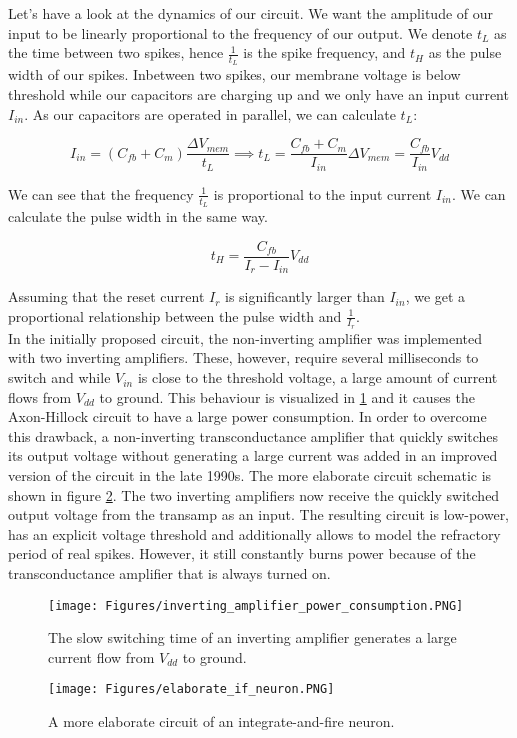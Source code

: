 Let's have a look at the dynamics of our circuit. We want the amplitude of our input to be linearly proportional to the frequency of our output. We denote $t_L$ as the time between two spikes, hence $\frac{1}{t_L}$ is the spike frequency, and $t_H$ as the pulse width of our spikes. Inbetween two spikes, our membrane voltage is below threshold while our capacitors are charging up and we only have an input current $I_{in}$. As our capacitors are operated in parallel, we can calculate $t_L$:

\begin{equation}
    I_{in} = (C_{fb} + C_m) \frac{\Delta V_{mem}}{t_L} \implies t_L = \frac{C_{fb} + C_m}{I_{in}} \Delta V_{mem} = \frac{C_{fb}}{I_{in}} V_{dd}
\end{equation}

We can see that the frequency $\frac{1}{t_L}$ is proportional to the input current $I_{in}$. We can calculate the pulse width in the same way.

\begin{equation}
    t_H = \frac{C_{fb}}{I_r - I_{in}} V_{dd}
\end{equation}

Assuming that the reset current $I_r$ is significantly larger than $I_{in}$, we get a proportional relationship between the pulse width and $\frac{1}{I_r}$.\\

In the initially proposed circuit, the non-inverting amplifier was implemented with two inverting amplifiers. These, however, require several milliseconds to switch and while $V_{in}$ is close to the threshold voltage, a large amount of current flows from $V_{dd}$ to ground. This behaviour is visualized in \ref{fig:inverting_amplifier_power_consumption} and it causes the Axon-Hillock circuit to have a large power consumption. In order to overcome this drawback, a non-inverting transconductance amplifier that quickly switches its output voltage without generating a large current was added in an improved version of the circuit in the late 1990s. The more elaborate circuit schematic is shown in figure \ref{fig:elaborate_if_circuit}. The two inverting amplifiers now receive the quickly switched output voltage from the transamp as an input. The resulting circuit is low-power, has an explicit voltage threshold and additionally allows to model the refractory period of real spikes. However, it still constantly burns power because of the transconductance amplifier that is always turned on.\\

\begin{figure}
    \centering
    \texttt{[image: Figures/inverting\_amplifier\_power\_consumption.PNG]}
    \caption{The slow switching time of an inverting amplifier generates a large current flow from $V_{dd}$ to ground.}
    \label{fig:inverting_amplifier_power_consumption}
\end{figure}

\begin{figure}
    \centering
    \texttt{[image: Figures/elaborate\_if\_neuron.PNG]}
    \caption{A more elaborate circuit of an integrate-and-fire neuron.}
    \label{fig:elaborate_if_circuit}
\end{figure}